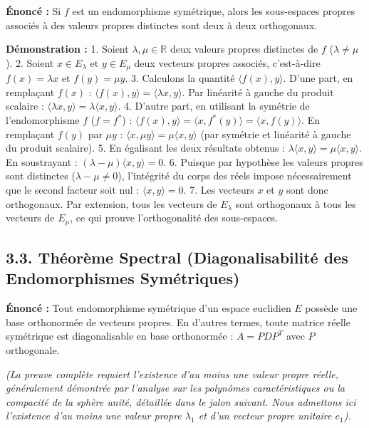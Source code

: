 \documentclass[11pt,a4paper]{article}
\begin{document}
\textbf{Énoncé :} Si $f$ est un endomorphisme symétrique, alors les sous-espaces propres associés à des valeurs propres distinctes sont deux à deux orthogonaux.

\textbf{Démonstration :}
1. Soient $\lambda, \mu \in \mathbb{R}$ deux valeurs propres distinctes de $f$ ($\lambda \neq \mu$).
2. Soient $x \in E_\lambda$ et $y \in E_\mu$ deux vecteurs propres associés, c'est-à-dire $f(x) = \lambda x$ et $f(y) = \mu y$.
3. Calculons la quantité $\langle f(x), y \rangle$.
   D'une part, en remplaçant $f(x)$ :
   $\langle f(x), y \rangle = \langle \lambda x, y \rangle$.
   Par linéarité à gauche du produit scalaire :
   $\langle \lambda x, y \rangle = \lambda \langle x, y \rangle$.
4. D'autre part, en utilisant la symétrie de l'endomorphisme $f$ ($f = f^*$) :
   $\langle f(x), y \rangle = \langle x, f^*(y) \rangle = \langle x, f(y) \rangle$.
   En remplaçant $f(y)$ par $\mu y$ :
   $\langle x, \mu y \rangle = \mu \langle x, y \rangle$ (par symétrie et linéarité à gauche du produit scalaire).
5. En égalisant les deux résultats obtenus :
   $\lambda \langle x, y \rangle = \mu \langle x, y \rangle$.
   En soustrayant :
   $(\lambda - \mu) \langle x, y \rangle = 0$.
6. Puisque par hypothèse les valeurs propres sont distinctes ($\lambda - \mu \neq 0$), l'intégrité du corps des réels impose nécessairement que le second facteur soit nul :
   $\langle x, y \rangle = 0$.
7. Les vecteurs $x$ et $y$ sont donc orthogonaux. Par extension, tous les vecteurs de $E_\lambda$ sont orthogonaux à tous les vecteurs de $E_\mu$, ce qui prouve l'orthogonalité des sous-espaces.

\subsection{3.3. Théorème Spectral (Diagonalisabilité des Endomorphismes Symétriques)}

\textbf{Énoncé :} Tout endomorphisme symétrique d'un espace euclidien $E$ possède une base orthonormée de vecteurs propres. En d'autres termes, toute matrice réelle symétrique est diagonalisable en base orthonormée : $A = P D P^T$ avec $P$ orthogonale.

\textit{(La preuve complète requiert l'existence d'au moins une valeur propre réelle, généralement démontrée par l'analyse sur les polynômes caractéristiques ou la compacité de la sphère unité, détaillée dans le jalon suivant. Nous admettons ici l'existence d'au moins une valeur propre $\lambda_1$ et d'un vecteur propre unitaire $e_1$).}
\end{document}
